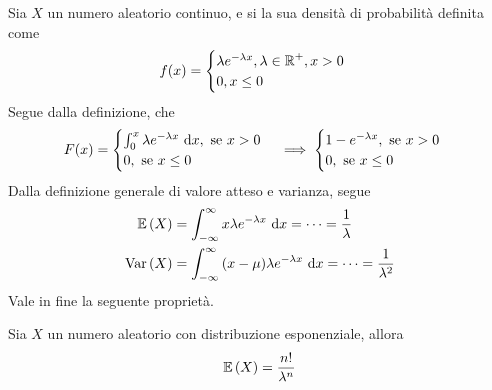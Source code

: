 \documentclass{subfiles}
\begin{document}
Sia \(X\) un numero aleatorio continuo, e si la sua densità di probabilità definita come
\[
    f(x) = \begin{cases}
        \lambda e^{-\lambda x}, \lambda \in \operatorname{\mathbb{R}}^{+}, x > 0 \\
        0, x \le 0
    \end{cases}\]
Segue dalla definizione, che
\[
    F(x) = \begin{cases}
        \Int{\lambda e^{-\lambda x}}{x}[0][x], \text{se} x > 0 \\
        0, \text{se} x \le 0
    \end{cases}   \implies \begin{cases}
        1 - e^{-\lambda x}, \text{se} x > 0 \\
        0, \text{se} x \le 0
    \end{cases}\]
Dalla definizione generale di valore atteso e varianza, segue
\[\begin{aligned}
        \Expected{X} & = \Int{x \lambda e^{-\lambda x}}{x}[-\infty][\infty] = \cdots = \Frac{1}{\lambda}             \\
        \Var{X}      & = \Int{(x - \mu) \lambda e^{-\lambda x}}{x}[-\infty][\infty] = \cdots = \Frac{1}{\lambda^{2}}
    \end{aligned}\]
Vale in fine la seguente proprietà.
\begin{Property*}
    Sia \(X\) un numero aleatorio con distribuzione esponenziale, allora
    \[
        \Expected{X} = \Frac{n!}{\lambda^{n}}
    \]
\end{Property*}
\end{document}
